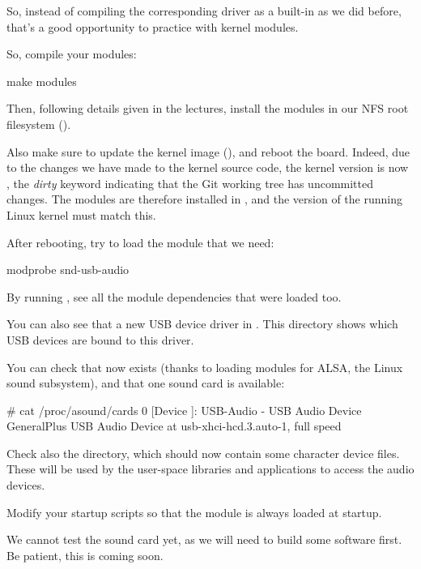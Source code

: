 So, instead of compiling the corresponding driver as a built-in as
we did before, that's a good opportunity to practice with kernel modules.

So, compile your modules:
\begin{bashinput}
make modules
\end{bashinput}

Then, following details given in the lectures, install the modules in our NFS
root filesystem ().

Also make sure to update the kernel image (), and reboot the
board.  Indeed, due to the changes we have made to the kernel source code,
the kernel version is now , the {\em dirty}
keyword indicating that the Git working tree has uncommitted changes.
The modules are therefore installed in ,
and the version of the running Linux kernel must match this.

After rebooting, try to load the module that we need:

\begin{bashinput}
modprobe snd-usb-audio
\end{bashinput}

By running , see all the module dependencies that
were loaded too.

You can also see that a new USB device driver in
. This directory shows which
USB devices are bound to this driver.

You can check that  now exists (thanks to loading
modules for ALSA, the Linux sound subsystem), and that one sound
card is available:

\begin{bashinput}
# cat /proc/asound/cards
 0 [Device         ]: USB-Audio - USB Audio Device
                      GeneralPlus USB Audio Device at usb-xhci-hcd.3.auto-1, full speed
\end{bashinput}

Check also the  directory, which should now contain
some character device files. These will be used by the user-space
libraries and applications to access the audio devices.

Modify your startup scripts so that the  module
is always loaded at startup.

We cannot test the sound card yet, as we will need to build some
software first. Be patient, this is coming soon.

